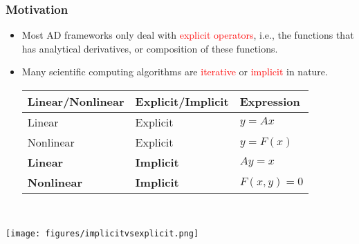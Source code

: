 \documentclass[usenames,dvipsnames]{beamer}
\begin{document}
\begin{frame}
	
	
	\frametitle{Motivation}
	
	
	\begin{minipage}{0.695\textwidth}
		\vspace{-6cm}
		\begin{itemize}
			\item Most AD frameworks only deal with \textcolor{red}{explicit operators}, i.e., the functions that has analytical derivatives, or composition of these functions. 
			\item Many scientific computing algorithms are \textcolor{red}{iterative} or \textcolor{red}{implicit} in nature.
			\vspace{1cm}
			{\small
			\begin{table}[]
				\begin{tabular}{@{}lll@{}}
					\toprule
					Linear/Nonlinear & Explicit/Implicit & Expression   \\ \midrule
					Linear           & Explicit          & $y=Ax$       \\
					Nonlinear        & Explicit          & $y = F(x)$   \\
					\textbf{Linear}           & \textbf{Implicit}          & $Ay = x$     \\
					\textbf{Nonlinear}        & \textbf{Implicit}          & $F(x,y) = 0$ \\ \bottomrule
				\end{tabular}
			\end{table}
		}
		\end{itemize}
	\end{minipage}~
	\begin{minipage}[t]{0.3\textwidth}
		\texttt{[image: figures/implicitvsexplicit.png]}
	\end{minipage}
	
	
\end{frame}
\end{document}
